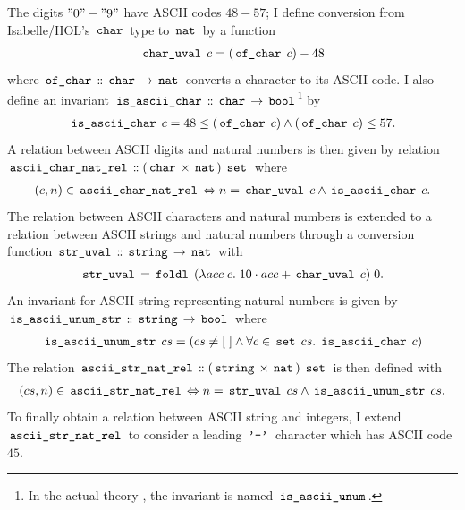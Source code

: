The digits $"0"-"9"$ have ASCII codes $48-57$; I define conversion from Isabelle/HOL's $\,\text{\ttfamily char}\,$ type to $\,\text{\ttfamily nat}\,$ by a function
\begin{gather*}
	\,\text{\ttfamily char\_uval}\, \; c = (\,\text{\ttfamily of\_char}\, \; c) - 48
\end{gather*}
where $\,\text{\ttfamily of\_char}\, \mathrel{\mathord{:}\mkern-1.2mu\mathord{:}} \,\text{\ttfamily char}\, \rightarrow \,\text{\ttfamily nat}\,$ converts a character to its ASCII code.
I also define an invariant $\,\text{\ttfamily is\_ascii\_char}\, \mathrel{\mathord{:}\mkern-1.2mu\mathord{:}} \,\text{\ttfamily char}\, \rightarrow \,\text{\ttfamily bool}\,$\footnote{In the actual theory , the invariant is named $\,\text{\ttfamily is\_ascii\_unum}\,$.} by
\begin{gather*}
	\,\text{\ttfamily is\_ascii\_char}\, \; c = 48 \leq (\,\text{\ttfamily of\_char}\, \; c) \land (\,\text{\ttfamily of\_char}\, \; c) \leq 57.
\end{gather*}
A relation between ASCII digits and natural numbers is then given by relation $\,\text{\ttfamily ascii\_char\_nat\_rel}\, \mathrel{\mathord{:}\mkern-1.2mu\mathord{:}} (\,\text{\ttfamily char}\, \times \,\text{\ttfamily nat}\,) \; \,\text{\ttfamily set}\,$ where
\begin{gather*}
	(c,n) \in \,\text{\ttfamily ascii\_char\_nat\_rel}\, \Leftrightarrow n = \,\text{\ttfamily char\_uval}\, \; c \land \,\text{\ttfamily is\_ascii\_char}\, \; c.
\end{gather*}
The relation between ASCII characters and natural numbers is extended to a relation between ASCII strings and natural numbers through a conversion function $\,\text{\ttfamily str\_uval}\, \mathrel{\mathord{:}\mkern-1.2mu\mathord{:}} \,\text{\ttfamily string}\, \rightarrow \,\text{\ttfamily nat}\,$
with
\begin{gather*}
	\,\text{\ttfamily str\_uval}\, = \,\text{\ttfamily foldl}\, \; (\lambda acc \; c. \; 10 \cdot acc + \,\text{\ttfamily char\_uval}\, \; c) \; 0.
\end{gather*}
An invariant for ASCII string representing natural numbers is given by $\,\text{\ttfamily is\_ascii\_unum\_str}\, \mathrel{\mathord{:}\mkern-1.2mu\mathord{:}} \,\text{\ttfamily string}\, \rightarrow \,\text{\ttfamily bool}\,$ where
\begin{gather*}
	\,\text{\ttfamily is\_ascii\_unum\_str}\, \; cs = (cs \neq [ \; ] \land \forall c \in \,\text{\ttfamily set}\, \; cs. \; \,\text{\ttfamily is\_ascii\_char}\, \; c)
\end{gather*}
The relation $\,\text{\ttfamily ascii\_str\_nat\_rel}\, \mathrel{\mathord{:}\mkern-1.2mu\mathord{:}} (\,\text{\ttfamily string}\, \times \,\text{\ttfamily nat}\,) \; \,\text{\ttfamily set}\,$ is then defined with
\begin{gather*}
	(cs,n) \in \,\text{\ttfamily ascii\_str\_nat\_rel}\, \Leftrightarrow n = \,\text{\ttfamily str\_uval}\, \; cs \land \,\text{\ttfamily is\_ascii\_unum\_str}\, \; cs.
\end{gather*}
To finally obtain a relation between ASCII string and integers, I extend $\,\text{\ttfamily ascii\_str\_nat\_rel}\,$ to consider a leading $\,\text{\ttfamily '-'}\,$ character which has ASCII code $45$.
